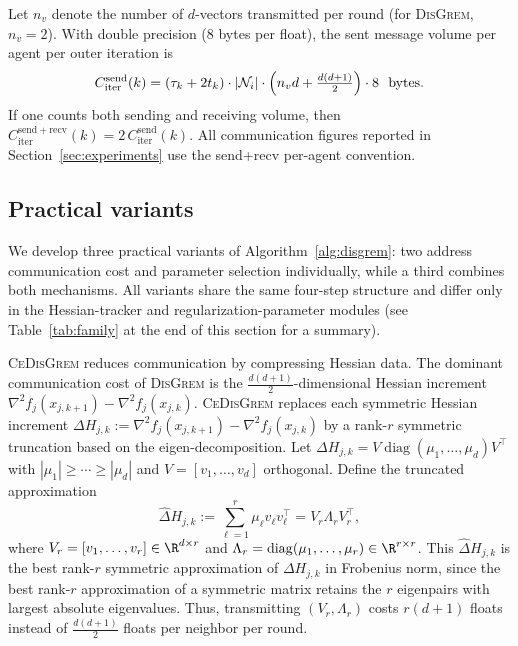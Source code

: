 \documentclass[review,onefignum,onetabnum]{siamart171218}
\begin{document}
Let $n_v$ denote the number of $d$-vectors transmitted per round (for \textsc{DisGrem}, $n_v=2$).
With double precision (8 bytes per float), the sent message volume per agent per outer iteration is
\begin{equation}\label{eq:comm_cost_iter}
	C_{\mathrm{iter}}^{\mathrm{send}}(k)
	= (\tau_k+2t_k)\cdot |\mathcal N_i|\cdot \Bigl(n_v d + \tfrac{d(d+1)}{2}\Bigr)\cdot 8 \ \ \text{bytes}.
\end{equation}
If one counts both sending and receiving volume, then
$C_{\mathrm{iter}}^{\mathrm{send+recv}}(k)=2\,C_{\mathrm{iter}}^{\mathrm{send}}(k)$.
All communication figures reported in Section~\ref{sec:experiments}
use the send+recv per-agent convention.

	\subsection{Practical variants}\label{ssec:variants}

We develop three practical variants of Algorithm~\ref{alg:disgrem}:
two address communication cost and parameter selection individually,
while a third combines both mechanisms.
All variants share the same four-step structure and differ only in the
Hessian-tracker and regularization-parameter modules
(see Table~\ref{tab:family} at the end of this section for a summary).

\textsc{CeDisGrem} reduces communication by compressing Hessian data.
The dominant communication cost of \textsc{DisGrem} is the $\frac{d(d+1)}{2}$-dimensional
Hessian increment $\nabla^2 f_j(x_{j,k+1})-\nabla^2 f_j(x_{j,k})$.
\textsc{CeDisGrem} replaces each symmetric Hessian increment
$\Delta H_{j,k}:=\nabla^2 f_j(x_{j,k+1})-\nabla^2 f_j(x_{j,k})$
by a rank-$r$ symmetric truncation based on the eigen-decomposition.
Let $\Delta H_{j,k}=V\operatorname{diag}(\mu_1,\dots,\mu_d)V^\top$ with
$|\mu_1|\ge \cdots \ge |\mu_d|$ and $V=[v_1,\dots,v_d]$ orthogonal.
Define the truncated approximation
\[
\hat\Delta H_{j,k}:=\sum_{\ell=1}^r \mu_\ell v_\ell v_\ell^\top
= V_r\Lambda_r V_r^\top,
\]
where $V_r=[v_1,\dots,v_r]\in\R^{d\times r}$ and $\Lambda_r=\operatorname{diag}(\mu_1,\dots,\mu_r)\in\R^{r\times r}$.
This $\hat\Delta H_{j,k}$ is the best rank-$r$ symmetric approximation of $\Delta H_{j,k}$ in Frobenius norm,
since the best rank-$r$ approximation of a symmetric matrix retains the $r$ eigenpairs with largest absolute eigenvalues.
Thus, transmitting $(V_r,\Lambda_r)$ costs $r(d+1)$ floats instead of $\frac{d(d+1)}{2}$ floats per neighbor per round.
\end{document}
